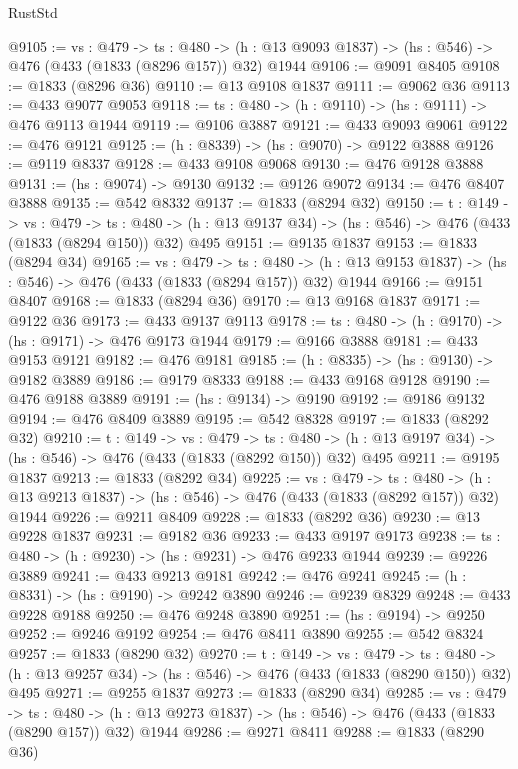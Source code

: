 \begin{lexlean}{RustStd}
\begin{coremodule}
@9105 := {vs : @479} ->
  {ts : @480} -> (h : @13 @9093 @1837) -> (hs : @546) -> @476 (@433 (@1833 (@8296 @157)) @32) @1944
@9106 := @9091 @8405
@9108 := @1833 (@8296 @36)
@9110 := @13 @9108 @1837
@9111 := @9062 @36
@9113 := @433 @9077 @9053
@9118 := {ts : @480} -> (h : @9110) -> (hs : @9111) -> @476 @9113 @1944
@9119 := @9106 @3887
@9121 := @433 @9093 @9061
@9122 := @476 @9121
@9125 := (h : @8339) -> (hs : @9070) -> @9122 @3888
@9126 := @9119 @8337
@9128 := @433 @9108 @9068
@9130 := @476 @9128 @3888
@9131 := (hs : @9074) -> @9130
@9132 := @9126 @9072
@9134 := @476 @8407 @3888
@9135 := @542 @8332
@9137 := @1833 (@8294 @32)
@9150 := {t : @149} ->
  {vs : @479} ->
  {ts : @480} -> (h : @13 @9137 @34) -> (hs : @546) -> @476 (@433 (@1833 (@8294 @150)) @32) @495
@9151 := @9135 @1837
@9153 := @1833 (@8294 @34)
@9165 := {vs : @479} ->
  {ts : @480} -> (h : @13 @9153 @1837) -> (hs : @546) -> @476 (@433 (@1833 (@8294 @157)) @32) @1944
@9166 := @9151 @8407
@9168 := @1833 (@8294 @36)
@9170 := @13 @9168 @1837
@9171 := @9122 @36
@9173 := @433 @9137 @9113
@9178 := {ts : @480} -> (h : @9170) -> (hs : @9171) -> @476 @9173 @1944
@9179 := @9166 @3888
@9181 := @433 @9153 @9121
@9182 := @476 @9181
@9185 := (h : @8335) -> (hs : @9130) -> @9182 @3889
@9186 := @9179 @8333
@9188 := @433 @9168 @9128
@9190 := @476 @9188 @3889
@9191 := (hs : @9134) -> @9190
@9192 := @9186 @9132
@9194 := @476 @8409 @3889
@9195 := @542 @8328
@9197 := @1833 (@8292 @32)
@9210 := {t : @149} ->
  {vs : @479} ->
  {ts : @480} -> (h : @13 @9197 @34) -> (hs : @546) -> @476 (@433 (@1833 (@8292 @150)) @32) @495
@9211 := @9195 @1837
@9213 := @1833 (@8292 @34)
@9225 := {vs : @479} ->
  {ts : @480} -> (h : @13 @9213 @1837) -> (hs : @546) -> @476 (@433 (@1833 (@8292 @157)) @32) @1944
@9226 := @9211 @8409
@9228 := @1833 (@8292 @36)
@9230 := @13 @9228 @1837
@9231 := @9182 @36
@9233 := @433 @9197 @9173
@9238 := {ts : @480} -> (h : @9230) -> (hs : @9231) -> @476 @9233 @1944
@9239 := @9226 @3889
@9241 := @433 @9213 @9181
@9242 := @476 @9241
@9245 := (h : @8331) -> (hs : @9190) -> @9242 @3890
@9246 := @9239 @8329
@9248 := @433 @9228 @9188
@9250 := @476 @9248 @3890
@9251 := (hs : @9194) -> @9250
@9252 := @9246 @9192
@9254 := @476 @8411 @3890
@9255 := @542 @8324
@9257 := @1833 (@8290 @32)
@9270 := {t : @149} ->
  {vs : @479} ->
  {ts : @480} -> (h : @13 @9257 @34) -> (hs : @546) -> @476 (@433 (@1833 (@8290 @150)) @32) @495
@9271 := @9255 @1837
@9273 := @1833 (@8290 @34)
@9285 := {vs : @479} ->
  {ts : @480} -> (h : @13 @9273 @1837) -> (hs : @546) -> @476 (@433 (@1833 (@8290 @157)) @32) @1944
@9286 := @9271 @8411
@9288 := @1833 (@8290 @36)

\end{coremodule}
\end{lexlean}
